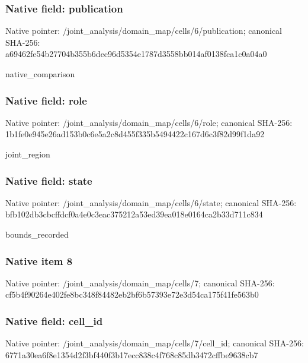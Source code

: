 \documentclass[10pt,a4paper]{article}
\begin{document}
\subsubsection{Native field: publication}
Native pointer: /joint\_\allowbreak{}analysis/domain\_\allowbreak{}map/cells/6/publication; canonical SHA-256: a69462fe54b27704b355b6dec96d5354e1787d3558bb014af0138fca1c0a04a0

\begingroup\raggedright\sloppy native\_\allowbreak{}comparison\par\endgroup

\subsubsection{Native field: role}
Native pointer: /joint\_\allowbreak{}analysis/domain\_\allowbreak{}map/cells/6/role; canonical SHA-256: 1b1fe0e945e26ad153b0c6e5a2c8d455f335b5494422c167d6c3f82d99f1da92

\begingroup\raggedright\sloppy joint\_\allowbreak{}region\par\endgroup

\subsubsection{Native field: state}
Native pointer: /joint\_\allowbreak{}analysis/domain\_\allowbreak{}map/cells/6/state; canonical SHA-256: bfb102db3cbcffdcf0a4e0c3eac375212a53ed39ea018e0164ca2b33d711c834

\begingroup\raggedright\sloppy bounds\_\allowbreak{}recorded\par\endgroup

\subsubsection{Native item 8}
Native pointer: /joint\_\allowbreak{}analysis/domain\_\allowbreak{}map/cells/7; canonical SHA-256: cf5b4f90264e402fe8bc348f84482eb2bf6b57393e72e3d54ca175f41fe563b0

\subsubsection{Native field: cell\_\allowbreak{}id}
Native pointer: /joint\_\allowbreak{}analysis/domain\_\allowbreak{}map/cells/7/cell\_\allowbreak{}id; canonical SHA-256: 6771a30ea6f8e1354d2f3bf440f3b17ecc838c4f768c85db3472cffbe9638cb7
\end{document}
